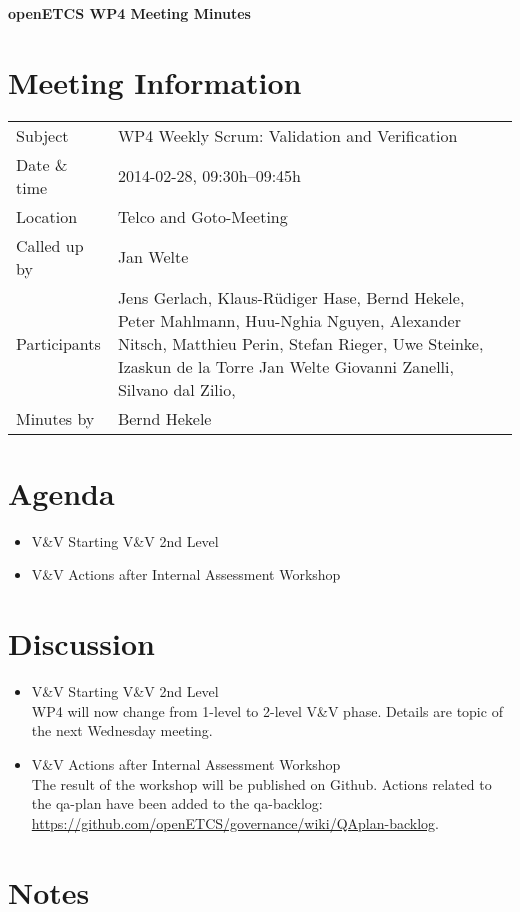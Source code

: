 \documentclass[a4paper, 11pt]{article}
\begin{document}
{\begin{center}\huge\bf openETCS WP4 Meeting Minutes\end{center}}
\section{Meeting Information}

\renewcommand{\arraystretch}{1.5}
\begin{supertabular}{m{.2\textwidth}m{.8\textwidth}}
Subject & WP4 Weekly Scrum: Validation and Verification\\
Date \& time & 2014-02-28, 09:30h--09:45h\\
Location & Telco and Goto-Meeting\\
Called up by & Jan Welte\\
Participants &
Jens Gerlach,
Klaus-R\"udiger Hase,
Bernd Hekele,
Peter Mahlmann,
Huu-Nghia Nguyen,
Alexander Nitsch,
Matthieu Perin,
Stefan Rieger,
Uwe Steinke,
Izaskun de la Torre
Jan Welte
Giovanni Zanelli,
Silvano dal Zilio,
\\

Minutes by & Bernd Hekele\\

\end{supertabular}
\renewcommand{\arraystretch}{1.0}


\section{{Agenda}}
\begin{itemize}
\item V\&V Starting V\&V 2nd Level 
\item V\&V Actions after Internal Assessment Workshop
\end{itemize}

\section{Discussion}

\begin{itemize}
\item V\&V Starting V\&V 2nd Level\\
WP4 will now change from 1-level to 2-level V\&V phase. Details are topic of the next Wednesday meeting.

\item V\&V Actions after Internal Assessment Workshop\\
The result of the workshop will be published on Github. Actions related to the qa-plan have been added to the qa-backlog: \url{https://github.com/openETCS/governance/wiki/QAplan-backlog}.

\end{itemize}


\section{Notes}
\end{document}
